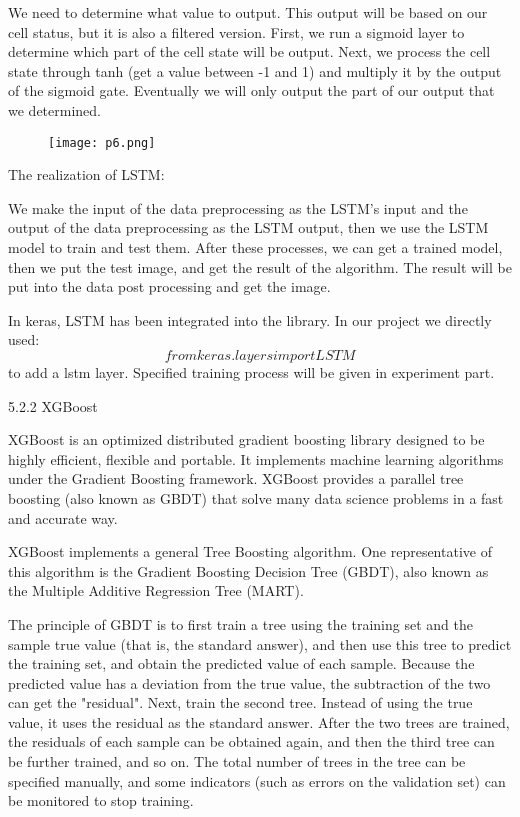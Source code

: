 \documentclass{acmtog} %
\begin{document}
We need to determine what value to output. This output will be based on our cell status, but it is also a filtered version. First, we run a sigmoid layer to determine which part of the cell state will be output. Next, we process the cell state through tanh (get a value between -1 and 1) and multiply it by the output of the sigmoid gate. Eventually we will only output the part of our output that we determined.
%
\begin{figure}[h]
\centerline{\texttt{[image: p6.png]}}
\end{figure}
%
The realization of LSTM:

We make the input of the data preprocessing as the LSTM’s input and the output of the data preprocessing as the LSTM output, then we use the LSTM model to train and test them. After these processes, we can get a trained model, then we put the test image, and get the result of the algorithm. The result will be put into the data post processing and get the image.

In keras, LSTM has been integrated into the library. In our project we directly used:
\begin{equation}
    from keras.layers import LSTM
\end{equation}
to add a lstm layer. Specified training process will be given in experiment part.

5.2.2 XGBoost

XGBoost is an optimized distributed gradient boosting library designed to be highly efficient, flexible and portable. It implements machine learning algorithms under the Gradient Boosting framework. XGBoost provides a parallel tree boosting (also known as GBDT) that solve many data science problems in a fast and accurate way.

XGBoost implements a general Tree Boosting algorithm. One representative of this algorithm is the Gradient Boosting Decision Tree (GBDT), also known as the Multiple Additive Regression Tree (MART).

The principle of GBDT is to first train a tree using the training set and the sample true value (that is, the standard answer), and then use this tree to predict the training set, and obtain the predicted value of each sample. Because the predicted value has a deviation from the true value, the subtraction of the two can get the "residual". Next, train the second tree. Instead of using the true value, it uses the residual as the standard answer. After the two trees are trained, the residuals of each sample can be obtained again, and then the third tree can be further trained, and so on. The total number of trees in the tree can be specified manually, and some indicators (such as errors on the validation set) can be monitored to stop training.
\end{document}
